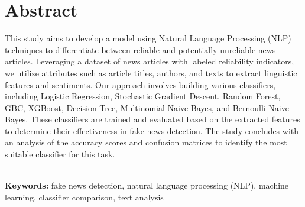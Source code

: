 \chapter*{\center \Large  Abstract}

This study aims to develop a model using Natural Language Processing (NLP) techniques to differentiate between reliable and potentially unreliable news articles. Leveraging a dataset of news articles with labeled reliability indicators, we utilize attributes such as article titles, authors, and texts to extract linguistic features and sentiments. Our approach involves building various classifiers, including Logistic Regression, Stochastic Gradient Descent, Random Forest, GBC, XGBoost, Decision Tree, Multinomial Naive Bayes, and Bernoulli Naive Bayes. These classifiers are trained and evaluated based on the extracted features to determine their effectiveness in fake news detection. The study concludes with an analysis of the accuracy scores and confusion matrices to identify the most suitable classifier for this task. 


~\\[1cm]
\noindent %
\textbf{Keywords:} fake news detection, natural language processing (NLP), machine learning, classifier comparison, text analysis 

\vfill
\noindent


